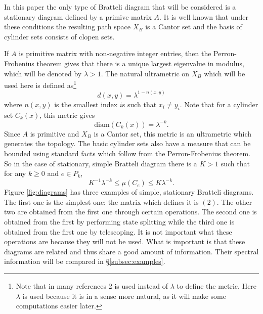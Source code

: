 \documentclass[12pt]{amsart}
\theoremstyle{plain}
\theoremstyle{definition}
\begin{document}
In this paper the only type of Bratteli diagram that will be considered is a stationary diagram defined by a primive matrix $A$. It is well known that under these conditions the resulting path space $X_B$ is a Cantor set and the basis of cylinder sets consists of clopen sets.

If $A$ is primitive matrix with non-negative integer entries, then the Perron-Frobenius theorem gives that there is a unique largest eigenvalue in modulus, which will be denoted by $\lambda>1$. The natural ultrametric on $X_B$ which will be used here is defined as\footnote{Note that in many references $2$ is used instead of $\lambda$ to define the metric. Here $\lambda$ is used because it is in a sense more natural, as it will make some computations easier later.}
$$d(x,y) = \lambda^{1-n(x,y)}$$
where $n(x,y)$ is the smallest index $i$s such that $x_i\neq y_i$. Note that for a cylinder set $C_k(x)$, this metric gives
\begin{equation}
    \label{eqn:diameter}
    \mathrm{diam}(C_k(x)) = \lambda^{-k}.
\end{equation}
Since $A$ is primitive and $X_B$ is a Cantor set, this metric is an ultrametric which generates the topology. The basic cylinder sets also have a measure that can be bounded using standard facts which follow from the Perron-Frobenius theorem. So in the case of stationary, simple Bratteli diagram there is a $K>1$ such that for any $k\geq 0$ and $e\in P_k$,
\begin{equation}
\label{eqn:parry}
K^{-1}\lambda^{-k}\leq \mu(C_e) \leq K\lambda^{-k}.
\end{equation}
Figure \ref{fig:diagrams} has three examples of simple, stationary Bratteli diagrams. The first one is the simplest one: the matrix which defines it is $(2)$. The other two are obtained from the first one through certain operations. The second one is obtained from the first by performing state splitting while the third one is obtained from the first one by telescoping. It is not important what these operations are because they will not be used. What is important is that these diagrams are related and thus share a good amount of information. Their spectral information will be compared in \S \ref{subsec:examples}.
\end{document}
